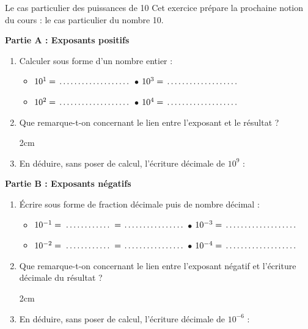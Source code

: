 \documentclass[a4paper]{book}
\begin{document}
    
    \begin{exercice}{Le cas particulier des puissances de 10}
        Cet exercice prépare la prochaine notion du cours : le cas particulier du nombre 10.
        
        \vspace{0.2cm}
        \textbf{Partie A : Exposants positifs}
        \begin{enumerate}
            \item Calculer sous forme d'un nombre entier : \medskip
            \begin{itemize}
                \renewcommand{\itemsep}{0.2cm}
                \item $10^1 = \makebox[3cm]{\dotfill}$ \hspace{2cm} $\bullet $ $10^3 = \makebox[3cm]{\dotfill}$
                \item $10^2 = \makebox[3cm]{\dotfill}$ \hspace{2cm} $\bullet $ $10^4 = \makebox[3cm]{\dotfill}$
            \end{itemize}
            \item Que remarque-t-on concernant le lien entre l'exposant et le résultat ?
            
            \begin{ZoneReponse}{2cm}\end{ZoneReponse}
            \item En déduire, sans poser de calcul, l'écriture décimale de $10^9$ : \makebox[5cm]{\dotfill}
        \end{enumerate}
        
        
        \textbf{Partie B : Exposants négatifs}
        \begin{enumerate}
            \item Écrire sous forme de fraction décimale puis de nombre décimal : \medskip
            \begin{itemize}
                \renewcommand{\itemsep}{0.2cm}
                \item $10^{-1} = \makebox[2cm]{\dotfill} = \makebox[2.5cm]{\dotfill}$ \hspace{2cm} $\bullet $ $10^{-3} = \makebox[3cm]{\dotfill}$ \medskip
                \item $10^{-2} = \makebox[2cm]{\dotfill} = \makebox[2.5cm]{\dotfill}$ \hspace{2cm} $\bullet $ $10^{-4} = \makebox[3cm]{\dotfill}$
            \end{itemize}
            \item Que remarque-t-on concernant le lien entre l'exposant négatif et l'écriture décimale du résultat ?
            
            \begin{ZoneReponse}{2cm}\end{ZoneReponse}
            \item En déduire, sans poser de calcul, l'écriture décimale de $10^{-6}$ : \makebox[4cm]{\dotfill}
        \end{enumerate}
    \end{exercice}
\end{document}
